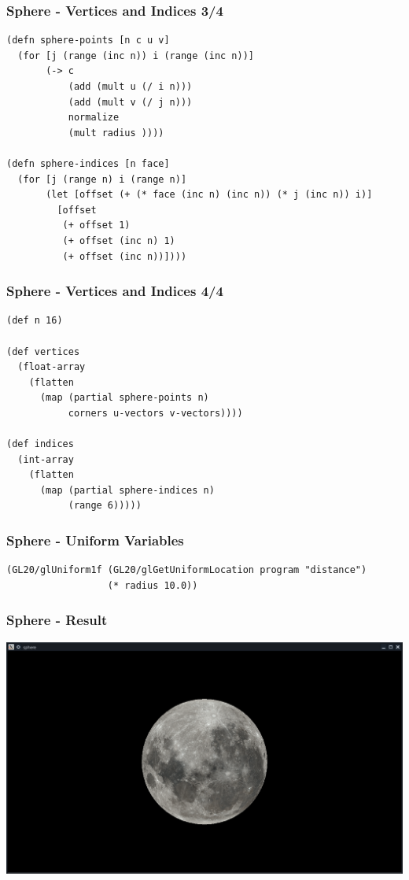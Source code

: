 \documentclass[aspectratio=169,11pt,xcolor=dvipsnames]{beamer}
\begin{document}
\begin{frame}[fragile]
  \frametitle{Sphere {-} Vertices and Indices 3/4}
  \begin{verbatim}
(defn sphere-points [n c u v]
  (for [j (range (inc n)) i (range (inc n))]
       (-> c
           (add (mult u (/ i n)))
           (add (mult v (/ j n)))
           normalize
           (mult radius ))))

(defn sphere-indices [n face]
  (for [j (range n) i (range n)]
       (let [offset (+ (* face (inc n) (inc n)) (* j (inc n)) i)]
         [offset
          (+ offset 1)
          (+ offset (inc n) 1)
          (+ offset (inc n))])))
  \end{verbatim}
\end{frame}

\begin{frame}[fragile]
  \frametitle{Sphere {-} Vertices and Indices 4/4}
  \begin{verbatim}
(def n 16)

(def vertices
  (float-array
    (flatten
      (map (partial sphere-points n)
           corners u-vectors v-vectors))))

(def indices
  (int-array
    (flatten
      (map (partial sphere-indices n)
           (range 6)))))
  \end{verbatim}
\end{frame}

\begin{frame}[fragile]
  \frametitle{Sphere {-} Uniform Variables}
  \begin{verbatim}
(GL20/glUniform1f (GL20/glGetUniformLocation program "distance")
                  (* radius 10.0))
  \end{verbatim}
\end{frame}

\begin{frame}
  \frametitle{Sphere {-} Result}
  \begin{center}
    \includegraphics[width=.8\textwidth]{sphere}
  \end{center}
\end{frame}
\end{document}
